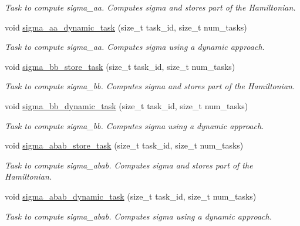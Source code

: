\begin{DoxyCompactItemize}
\begin{DoxyCompactList}\small\item\em Task to compute sigma\+\_\+aa. Computes sigma and stores part of the Hamiltonian. \end{DoxyCompactList}\item 
void \mbox{\hyperlink{classforte_1_1_sigma_vector_dynamic_acb207c4804b33a07797fbe4c5e203348}{sigma\+\_\+aa\+\_\+dynamic\+\_\+task}} (size\+\_\+t task\+\_\+id, size\+\_\+t num\+\_\+tasks)
\begin{DoxyCompactList}\small\item\em Task to compute sigma\+\_\+aa. Computes sigma using a dynamic approach. \end{DoxyCompactList}\item 
void \mbox{\hyperlink{classforte_1_1_sigma_vector_dynamic_ac0bab0d24d52fa504955f030d9ad5c1b}{sigma\+\_\+bb\+\_\+store\+\_\+task}} (size\+\_\+t task\+\_\+id, size\+\_\+t num\+\_\+tasks)
\begin{DoxyCompactList}\small\item\em Task to compute sigma\+\_\+bb. Computes sigma and stores part of the Hamiltonian. \end{DoxyCompactList}\item 
void \mbox{\hyperlink{classforte_1_1_sigma_vector_dynamic_a6fd74c1a7c959e833a08218aa417e312}{sigma\+\_\+bb\+\_\+dynamic\+\_\+task}} (size\+\_\+t task\+\_\+id, size\+\_\+t num\+\_\+tasks)
\begin{DoxyCompactList}\small\item\em Task to compute sigma\+\_\+bb. Computes sigma using a dynamic approach. \end{DoxyCompactList}\item 
void \mbox{\hyperlink{classforte_1_1_sigma_vector_dynamic_a3ffe1f2de8091c52c95f6afa8359c6a1}{sigma\+\_\+abab\+\_\+store\+\_\+task}} (size\+\_\+t task\+\_\+id, size\+\_\+t num\+\_\+tasks)
\begin{DoxyCompactList}\small\item\em Task to compute sigma\+\_\+abab. Computes sigma and stores part of the Hamiltonian. \end{DoxyCompactList}\item 
void \mbox{\hyperlink{classforte_1_1_sigma_vector_dynamic_a1b847accdb778cc177f56f2b5e23ae31}{sigma\+\_\+abab\+\_\+dynamic\+\_\+task}} (size\+\_\+t task\+\_\+id, size\+\_\+t num\+\_\+tasks)
\begin{DoxyCompactList}\small\item\em Task to compute sigma\+\_\+abab. Computes sigma using a dynamic approach. \end{DoxyCompactList}\item 

\end{DoxyCompactItemize}
